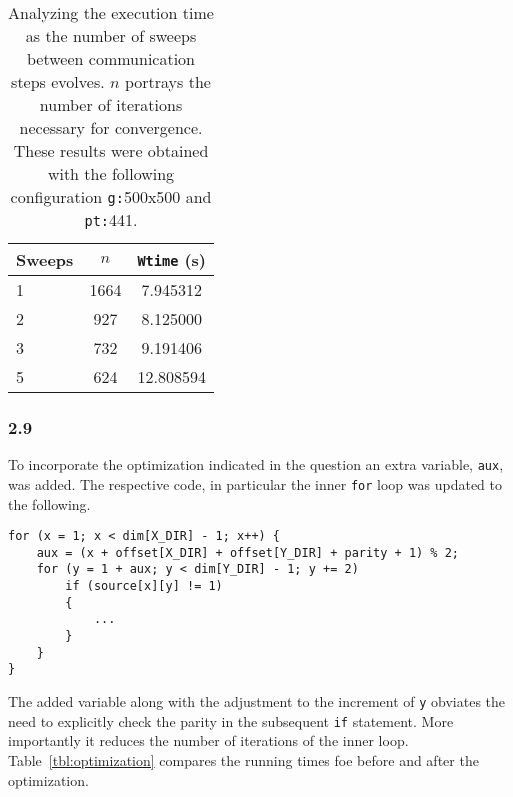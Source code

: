 \begin{table}[H]
\centering
\begin{tabular}{l*{2}{c}}
 \toprule
Sweeps  &   $n$   &   \texttt{Wtime} (\si{s}) \\ \midrule
1       &   1664  &   7.945312 \\
2       &   927   &   8.125000 \\
3       &   732   &   9.191406 \\
5       &   624   &  12.808594 \\
\bottomrule
\end{tabular}
\caption{Analyzing the execution time as the number of sweeps between communication steps evolves. $n$ portrays the number of iterations necessary for convergence. These results were obtained with the following configuration \texttt{g:}500x500 and \texttt{pt:}441.}
\label{tbl:sweeps}
\end{table}


\subsubsection{2.9}

To incorporate the optimization indicated in the question an extra variable, \texttt{aux}, was added.
The respective code, in particular the inner \texttt{for} loop was updated to the following.

\begin{lstlisting}
for (x = 1; x < dim[X_DIR] - 1; x++) {
	aux = (x + offset[X_DIR] + offset[Y_DIR] + parity + 1) % 2;
	for (y = 1 + aux; y < dim[Y_DIR] - 1; y += 2)  
		if (source[x][y] != 1)
		{
			...
		}
	}
}
\end{lstlisting}

The added variable along with the adjustment to the increment of \texttt{y} obviates the need to explicitly check the parity in the subsequent \texttt{if} statement.
More importantly it reduces the number of iterations of the inner loop. Table~\ref{tbl:optimization} compares the running times foe before and after the optimization.

